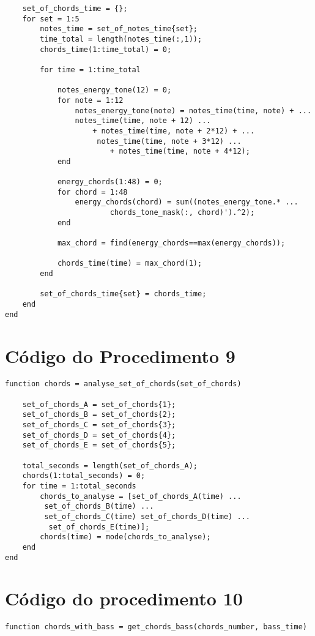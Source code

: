 \begin{apendicesenv}
\begin{lstlisting}
    set_of_chords_time = {};
    for set = 1:5
        notes_time = set_of_notes_time{set};
        time_total = length(notes_time(:,1));
        chords_time(1:time_total) = 0;

        for time = 1:time_total
            
            notes_energy_tone(12) = 0;
            for note = 1:12
                notes_energy_tone(note) = notes_time(time, note) + ... 
                notes_time(time, note + 12) ...
                    + notes_time(time, note + 2*12) + ...
                     notes_time(time, note + 3*12) ...
                        + notes_time(time, note + 4*12);
            end

            energy_chords(1:48) = 0;
            for chord = 1:48
                energy_chords(chord) = sum((notes_energy_tone.* ...
                        chords_tone_mask(:, chord)').^2);
            end
            
            max_chord = find(energy_chords==max(energy_chords));

            chords_time(time) = max_chord(1);
        end

        set_of_chords_time{set} = chords_time;
    end
end
\end{lstlisting}

\section{Código do Procedimento 9}
\label{sec:codigo_procedimento_9}
\begin{lstlisting}
function chords = analyse_set_of_chords(set_of_chords)

    set_of_chords_A = set_of_chords{1};
    set_of_chords_B = set_of_chords{2};
    set_of_chords_C = set_of_chords{3};
    set_of_chords_D = set_of_chords{4};
    set_of_chords_E = set_of_chords{5};

    total_seconds = length(set_of_chords_A);
    chords(1:total_seconds) = 0;
    for time = 1:total_seconds
        chords_to_analyse = [set_of_chords_A(time) ...
         set_of_chords_B(time) ...
         set_of_chords_C(time) set_of_chords_D(time) ...
          set_of_chords_E(time)];
        chords(time) = mode(chords_to_analyse);
    end
end
\end{lstlisting}

\section{Código do procedimento 10}
\label{sec:codigo_procedimento_10}
\begin{lstlisting}
function chords_with_bass = get_chords_bass(chords_number, bass_time)


\end{lstlisting}
\end{apendicesenv}
